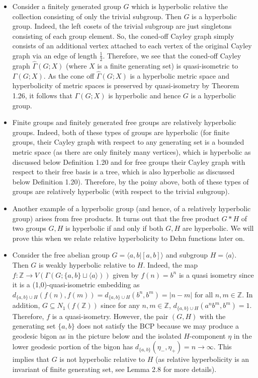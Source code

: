 \documentclass[12pt]{article}
\begin{document}
	\begin{itemize}
		\item Consider a finitely generated group $G$ which is hyperbolic relative the collection consisting of only the trivial subgroup. Then $G$ is a hyperbolic group. Indeed, the left cosets of the trivial subgroup are just singletons consisting of each group element. So, the coned-off Cayley graph simply consists of an additional vertex attached to each vertex of the original Cayley graph via an edge of length $\frac{1}{2}$. Therefore, we see that the coned-off Cayley graph $\hat{\Gamma}(G; X)$ (where $X$ is a finite generating set) is quasi-isometric to $\Gamma(G;X)$. As the cone off $\hat{\Gamma}(G; X)$ is a hyperbolic metric space and hyperbolicity of metric spaces is preserved by quasi-isometry by Theorem 1.26, it follows that $\Gamma(G;X)$ is hyperbolic and hence $G$ is a hyperbolic group. 
		\item Finite groups and finitely generated free groups are relatively hyperbolic groups. Indeed, both of these types of groups are hyperbolic (for finite groups, their Cayley graph with respect to any generating set is a bounded metric space (as there are only finitely many vertices), which is hyperbolic as discussed below Definition 1.20 and for free groups their Cayley graph with respect to their free basis is a tree, which is also hyperbolic as discussed below Definition 1.20). Therefore, by the poiny above, both of these types of groups are relatively hyperbolic (with respect to the trivial subgroup). 
		\item Another example of a hyperbolic group (and hence, of a relatively hyperbolic group) arises from free products. It turns out that the free product $G * H$ of two groups $G,H$ is hyperbolic if and only if both $G, H$ are hyperbolic. We will prove this when we relate relative hyperbolicity to Dehn functions later on. 
		\item Consider the free abelian group $G = \langle a,b \vert [a,b] \rangle$ and subgroup $H = \langle a \rangle$. Then $G$ is weakly hyperbolic relative to $H$. Indeed, the map $f: \mathbb{Z} \rightarrow V(\Gamma(G; \{a,b\} \sqcup \langle a \rangle))$ given by $f(n) = b^n$ is a quasi isometry since it is a (1,0)-quasi-isometric embedding as $d_{\{a,b\} \cup H} (f(n),f(m)) = d_{\{a,b\} \cup H} (b^n,b^m) = \vert n - m \vert$ for all $n,m \in \mathbb{Z}$. In addition, $G \subseteq N_1(f(\mathbb{Z}))$ since for any $n,m \in \mathbb{Z}$, $d_{\{a,b\} \cup H}(a^nb^m, b^m) = 1$. Therefore, $f$ is a quasi-isometry. However, the pair $(G,H)$ with the generating set $\{a,b\}$ does not satisfy the BCP because we may produce a geodesic bigon as in the picture below and the isolated $H$-component $\eta$ in the lower geodesic portion of the bigon has $d_{\{a,b\}} (\eta_{-}, \eta_{+}) = n \rightarrow \infty$. This implies that $G$ is not hyperbolic relative to $H$ (as relative hyperbolicity is an invariant of finite generating set, see Lemma 2.8 for more details). 

\end{itemize}
\end{document}
